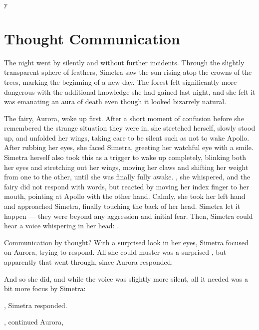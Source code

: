 y\chapter{Thought Communication}
\label{cha:thought-communication}
The night went by silently and without further incidents. Through the slightly transparent sphere of feathers, Simetra saw the sun rising atop the crowns of the trees, marking the beginning of a new day. The forest felt significantly more dangerous with the additional knowledge she had gained last night, and she felt it was emanating an aura of death even though it looked bizarrely natural.

The fairy, Aurora, woke up first. After a short moment of confusion before she remembered the strange situation they were in, she stretched herself, slowly stood up, and unfolded her wings, taking care to be silent such as not to wake Apollo. After rubbing her eyes, she faced Simetra, greeting her watchful eye with a smile. Simetra herself also took this as a trigger to wake up completely, blinking both her eyes and stretching out her wings, moving her claws and shifting her weight from one to the other, until she was finally fully awake. , she whispered, and the fairy did not respond with words, but reacted by moving her index finger to her mouth, pointing at Apollo with the other hand. Calmly, she took her left hand and approached Simetra, finally touching the back of her head. Simetra let it happen --- they were beyond any aggression and initial fear. Then, Simetra could hear a voice whispering in her head: .

Communication by thought? With a surprised look in her eyes, Simetra focused on Aurora, trying to respond. All she could muster was a surprised , but apparently that went through, since Aurora responded: 

And so she did, and while the voice was slightly more silent, all it needed was a bit more focus by Simetra: 

, Simetra responded.

, continued Aurora, 

